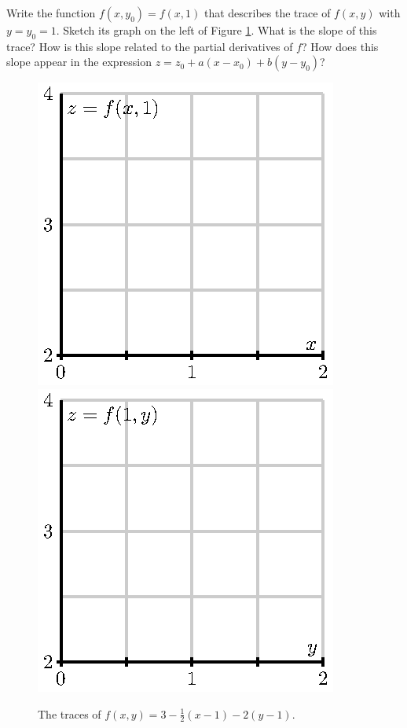 \begin{pa}
  \item Write the function $f(x, y_0) = f(x,1)$ that describes the
    trace of $f(x,y)$ with $y=y_0=1$.  Sketch its graph on the left of
    Figure \ref{F:10.4.preview.1}.  What is the slope of this trace?
    How is this slope related to the partial derivatives of $f$?  How
    does this slope appear in the expression $z=z_0 + a(x-x_0) +
    b(y-y_0)$? 

  \begin{figure}[ht]
    \begin{center}
      \includegraphics{figures/fig_10_4_preview_1.eps}
      \hspace*{20pt}
      \includegraphics{figures/fig_10_4_preview_2.eps}
    \end{center}
    \caption{The traces of $f(x,y)=3-\frac12(x-1)-2(y-1)$.}
    \label{F:10.4.preview.1}
  \end{figure}


\end{pa}
